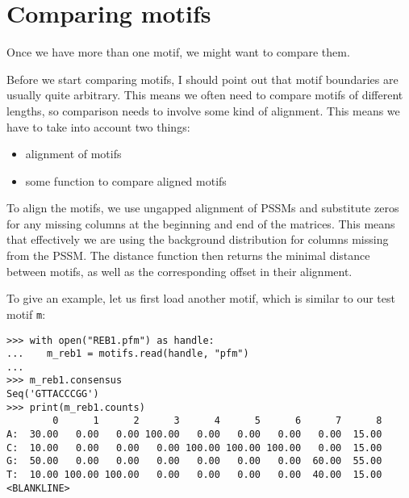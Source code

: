\section{Comparing motifs}
\label{sec:comp}
Once we have more than one motif, we might want to compare them.

Before we start comparing motifs, I should point out that motif
boundaries are usually quite arbitrary. This means we often need
to compare motifs of different lengths, so comparison needs to involve
some kind of alignment.  This means we have to take into account two things:
\begin{itemize}
\item alignment of motifs
\item some function to compare aligned motifs
\end{itemize}
To align the motifs, we use ungapped alignment of PSSMs and substitute zeros
for any missing columns at the beginning and end of the matrices. This means
that effectively we are using the background distribution for columns missing
from the PSSM.
The distance function then returns the minimal distance between motifs, as
well as the corresponding offset in their alignment.

To give an example, let us first load another motif,
which is similar to our test motif \verb|m|:
\begin{verbatim}
>>> with open("REB1.pfm") as handle:
...    m_reb1 = motifs.read(handle, "pfm")
...
>>> m_reb1.consensus
Seq('GTTACCCGG')
>>> print(m_reb1.counts)
        0      1      2      3      4      5      6      7      8
A:  30.00   0.00   0.00 100.00   0.00   0.00   0.00   0.00  15.00
C:  10.00   0.00   0.00   0.00 100.00 100.00 100.00   0.00  15.00
G:  50.00   0.00   0.00   0.00   0.00   0.00   0.00  60.00  55.00
T:  10.00 100.00 100.00   0.00   0.00   0.00   0.00  40.00  15.00
<BLANKLINE>
\end{verbatim}

